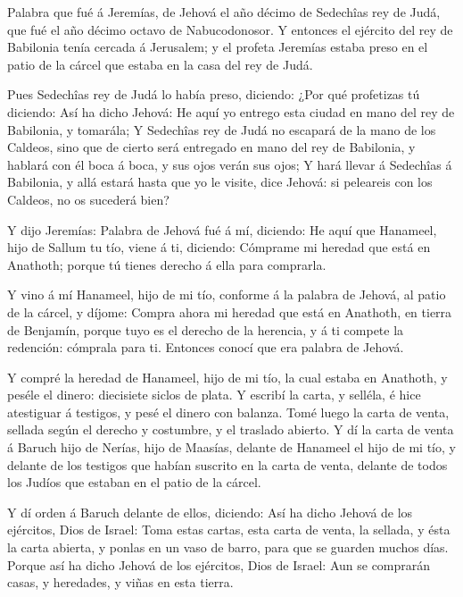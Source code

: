  Palabra que fué á Jeremías, de Jehová el año décimo de
Sedechîas rey de Judá, que fué el año décimo octavo de Nabucodonosor.
 Y entonces el ejército del rey de Babilonia tenía cercada
á Jerusalem; y el profeta Jeremías estaba preso en el patio de la cárcel
que estaba en la casa del rey de Judá.

 Pues Sedechîas rey de Judá lo había preso, diciendo: ¿Por
qué profetizas tú diciendo: Así ha dicho Jehová: He aquí yo entrego esta
ciudad en mano del rey de Babilonia, y tomarála;  Y
Sedechîas rey de Judá no escapará de la mano de los Caldeos, sino que de
cierto será entregado en mano del rey de Babilonia, y hablará con él
boca á boca, y sus ojos verán sus ojos;  Y hará llevar á
Sedechîas á Babilonia, y allá estará hasta que yo le visite, dice
Jehová: si peleareis con los Caldeos, no os sucederá bien?

 Y dijo Jeremías: Palabra de Jehová fué á mí, diciendo:
 He aquí que Hanameel, hijo de Sallum tu tío, viene á ti,
diciendo: Cómprame mi heredad que está en Anathoth; porque tú tienes
derecho á ella para comprarla.

 Y vino á mí Hanameel, hijo de mi tío, conforme á la
palabra de Jehová, al patio de la cárcel, y díjome: Compra ahora mi
heredad que está en Anathoth, en tierra de Benjamín, porque tuyo es el
derecho de la herencia, y á ti compete la redención: cómprala para ti.
Entonces conocí que era palabra de Jehová.

 Y compré la heredad de Hanameel, hijo de mi tío, la cual
estaba en Anathoth, y peséle el dinero: diecisiete siclos de plata.
 Y escribí la carta, y selléla, é hice atestiguar á
testigos, y pesé el dinero con balanza.  Tomé luego la
carta de venta, sellada según el derecho y costumbre, y el traslado
abierto.  Y dí la carta de venta á Baruch hijo de Nerías,
hijo de Maasías, delante de Hanameel el hijo de mi tío, y delante de los
testigos que habían suscrito en la carta de venta, delante de todos los
Judíos que estaban en el patio de la cárcel.

 Y dí orden á Baruch delante de ellos, diciendo:
 Así ha dicho Jehová de los ejércitos, Dios de Israel:
Toma estas cartas, esta carta de venta, la sellada, y ésta la carta
abierta, y ponlas en un vaso de barro, para que se guarden muchos días.
 Porque así ha dicho Jehová de los ejércitos, Dios de
Israel: Aun se comprarán casas, y heredades, y viñas en esta tierra.

